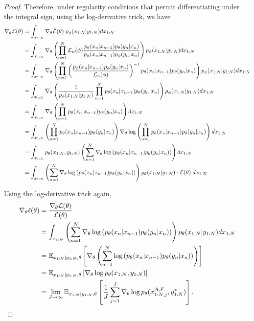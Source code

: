 \documentclass{article}
\begin{document}
\begin{proof}
    Therefore, under regularity conditions that permit differentiating under the integral sign, using the log-derivative trick, we have
    \begin{align*}
        \nabla_\theta \mathcal{L}(\theta)
        &= \int_{x_{1:N}} \nabla_\theta \hat{\mathcal{L}}(\theta) \;p_\phi(x_{1:N}|y_{1:N})dx_{1:N}\\
        &= \int_{x_{1:N}} \nabla_\theta \left(\prod_{n=1}^N \mathcal{L}_n(\phi) \frac{p_\theta(x_n|x_{n-1})p_\theta(y_n|x_n)}{p_\phi(x_n|x_{n-1})p_\phi(y_n|x_n) }\right)p_\phi(x_{1:N}|y_{1:N}) dx_{1:N} \\
        &= \int_{x_{1:N}} \nabla_\theta \left(\prod_{n=1}^N \left(\frac{p_\phi(x_n|x_{n-1})p_\phi(y_n|x_n)}{\mathcal{L}_n(\phi)}\right)^{-1} p_\theta(x_n|x_{n-1})p_\theta(y_n|x_n)\right)p_\phi(x_{1:N}|y_{1:N}) dx_{1:N} \\
        &= \int_{x_{1:N}} \nabla_\theta \left(\frac{1}{p_\phi(x_{1:N}|y_{1:N}) }\prod_{n=1}^N p_\theta(x_n|x_{n-1})p_\theta(y_n|x_n)\right)p_\phi(x_{1:N}|y_{1:N}) dx_{1:N} \\
        &= \int_{x_{1:N}} \nabla_\theta \left(\prod_{n=1}^N p_\theta(x_n|x_{n-1})p_\theta(y_n|x_n)\right) dx_{1:N} \\
        &= \int_{x_{1:N}} \left(\prod_{n=1}^N p_\theta(x_n|x_{n-1})p_\theta(y_n|x_n)\right)\nabla_\theta \log\left(\prod_{n=1}^N p_\theta(x_n|x_{n-1})p_\theta(y_n|x_n)\right) dx_{1:N} \\
        &= \int_{x_{1:N}} p_\theta(x_{1:N},y_{1:N}) \left(\sum_{n=1}^N \nabla_\theta \log\left(p_\theta(x_n|x_{n-1})p_\theta(y_n|x_n)\right)\right) dx_{1:N} \\
        &= \int_{x_{1:N}} \left(\sum_{n=1}^N \nabla_\theta \log\left(p_\theta(x_n|x_{n-1})p_\theta(y_n|x_n)\right)\right) p_\theta(x_{1:N}|y_{1:N}) \cdot \mathcal{L}(\theta) \; dx_{1:N}. 
    \end{align*}

    Using the log-derivative trick again,
    \begin{align*}
        \nabla_\theta \ell(\theta)
        &= \frac{\nabla_\theta \mathcal{L}(\theta)}{\mathcal{L}(\theta)} \\
        &= \int_{x_{1:N}} \left(\sum_{n=1}^N \nabla_\theta \log\left(p_\theta(x_n|x_{n-1})p_\theta(y_n|x_n)\right)\right) p_\theta(x_{1:N}|y_{1:N}) dx_{1:N} \\
        &= \mathbb{E}_{x_{1:N}|y_{1:N}, \theta}\left[\nabla_\theta \left(\sum_{n=1}^N\log\left(p_\theta(x_n|x_{n-1})p_\theta(y_n|x_n)\right)\right)\right] \\
        &= \mathbb{E}_{x_{1:N}|y_{1:N}, \theta}\left[\nabla_\theta\log p_\theta(x_{1:N},y_{1:N})\right] \\
        &= \lim_{J\to\infty} \mathbb{E}_{x_{1:N}|y_{1:N}, \theta}\left[\frac{1}{J}\sum_{j=1}^J\nabla_\theta \log p_\theta(x_{1:N,j}^{A,F},y_{1:N}^*)\right].
    \end{align*}


\end{proof}
\end{document}
